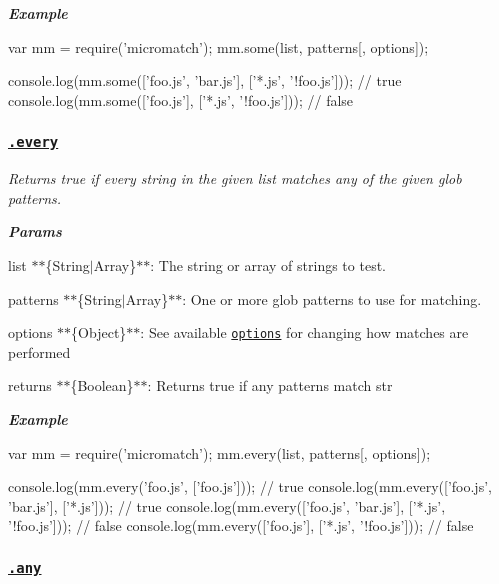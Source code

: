 {\itshape {\bfseries Example}}

{\itshape 
\begin{DoxyCode}
var mm = require('micromatch');
mm.some(list, patterns[, options]);

console.log(mm.some(['foo.js', 'bar.js'], ['*.js', '!foo.js']));
// true
console.log(mm.some(['foo.js'], ['*.js', '!foo.js']));
// false
\end{DoxyCode}
}

{\itshape \subsubsection*{\href{index.js#L228}{\tt .every}}}

{\itshape }

{\itshape Returns true if every string in the given {\ttfamily list} matches any of the given glob {\ttfamily patterns}.}

{\itshape {\bfseries Params}}

{\itshape 
\begin{DoxyItemize}
\item {\ttfamily list} $\ast$$\ast$\{String$\vert$\+Array\}$\ast$$\ast$\+: The string or array of strings to test.
\item {\ttfamily patterns} $\ast$$\ast$\{String$\vert$\+Array\}$\ast$$\ast$\+: One or more glob patterns to use for matching.
\item {\ttfamily options} $\ast$$\ast$\{Object\}$\ast$$\ast$\+: See available \href{#options}{\tt options} for changing how matches are performed
\item {\ttfamily returns} $\ast$$\ast$\{Boolean\}$\ast$$\ast$\+: Returns true if any patterns match {\ttfamily str}
\end{DoxyItemize}}

{\itshape {\bfseries Example}}

{\itshape 
\begin{DoxyCode}
var mm = require('micromatch');
mm.every(list, patterns[, options]);

console.log(mm.every('foo.js', ['foo.js']));
// true
console.log(mm.every(['foo.js', 'bar.js'], ['*.js']));
// true
console.log(mm.every(['foo.js', 'bar.js'], ['*.js', '!foo.js']));
// false
console.log(mm.every(['foo.js'], ['*.js', '!foo.js']));
// false
\end{DoxyCode}
}

{\itshape \subsubsection*{\href{index.js#L260}{\tt .any}}}


